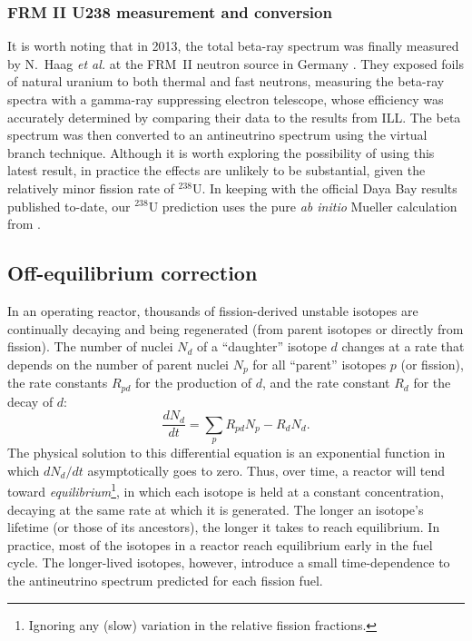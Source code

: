 \documentclass[../thesis.tex]{subfiles}
\begin{document}
\subsubsection{FRM II U238 measurement and conversion}
\label{sec:u238conv}

It is worth noting that in 2013, the \ureight total beta-ray spectrum was finally measured by N.~Haag \emph{et al.} at the FRM~II neutron source in Germany \cite{PhysRevLett.112.122501}. They exposed foils of natural uranium to both thermal and fast neutrons, measuring the beta-ray spectra with a gamma-ray suppressing electron telescope, whose efficiency was accurately determined by comparing their \urfive data to the results from ILL. The beta spectrum was then converted to an antineutrino spectrum using the virtual branch technique. Although it is worth exploring the possibility of using this latest result, in practice the effects are unlikely to be substantial, given the relatively minor fission rate of $^{238}$U. In keeping with the official Daya Bay results published to-date, our $^{238}$U prediction uses the pure \emph{ab initio} Mueller calculation from \cite{PhysRevC.83.054615}.

\subsection{Off-equilibrium correction}
\label{sec:offeqcorr}

In an operating reactor, thousands of fission-derived unstable isotopes are continually decaying and being regenerated (from parent isotopes or directly from fission). The number of nuclei $N_d$ of a ``daughter'' isotope $d$ changes at a rate that depends on the number of parent nuclei $N_p$ for all ``parent'' isotopes $p$ (or fission), the rate constants $R_{pd}$ for the production of $d$, and the rate constant $R_d$ for the decay of $d$:
\begin{equation}
  \frac{dN_d}{dt} = \sum_p R_{pd} N_p - R_d N_d.
\end{equation}
The physical solution to this differential equation is an exponential function in which $dN_d/dt$ asymptotically goes to zero. Thus, over time, a reactor will tend toward \emph{equilibrium}\footnote{Ignoring any (slow) variation in the relative fission fractions.}, in which each isotope is held at a constant concentration, decaying at the same rate at which it is generated. The longer an isotope's lifetime (or those of its ancestors), the longer it takes to reach equilibrium. In practice, most of the isotopes in a reactor reach equilibrium early in the fuel cycle. The longer-lived isotopes, however, introduce a small time-dependence to the antineutrino spectrum predicted for each fission fuel.
\end{document}
